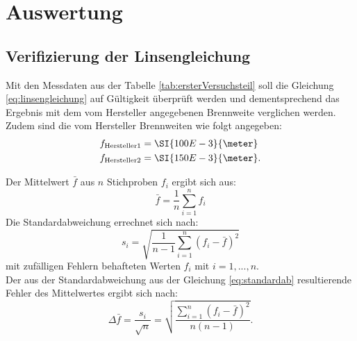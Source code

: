 \section{Auswertung}
\label{sec:Auswertung}
\subsection{Verifizierung der Linsengleichung}
Mit den Messdaten aus der Tabelle \ref{tab:ersterVersuchsteil} soll die Gleichung \ref{eq:linsengleichung} auf Gültigkeit überprüft werden und dementsprechend das Ergebnis mit dem vom Hersteller angegebenen Brennweite verglichen werden. Zudem sind die vom Hersteller Brennweiten wie folgt angegeben:
\begin{align*}
f_\text{Hersteller1} &= \SI{100 E-3}{\meter} \\
f_\text{Hersteller2} &= \SI{150 E-3}{\meter}. \\
\end{align*}

Der Mittelwert $\bar{f}$ aus $n$ Stichproben $f_{i}$ ergibt sich aus:
\begin{equation}
\bar{f}=\frac{1}{n}\sum \limits_{i=1}^n f_{i}
\label{eq:mittelwert}
\end{equation}
Die Standardabweichung errechnet sich nach:
\begin{equation}
\label{eq:standardab}
s_{i}= \sqrt{\frac{1}{n-1}\sum \limits_{i=1}^n(f_{i}-\bar{f})^2}
\end{equation}
mit zufälligen Fehlern behafteten Werten $f_{i}$ mit $i = 1,...,n$.\\
Der aus der Standardabweichung aus der Gleichung \ref{eq:standardab} resultierende Fehler des Mittelwertes ergibt sich nach:
\begin{equation}
\Delta\bar{f}=\frac{s_{i}}{\sqrt{n}} = \sqrt{\frac{\sum\limits_{i=1}^n(f_{i}-\bar{f})^2}{n(n-1)}}.
\label{eq:fehlermittelwert}
\end{equation}

